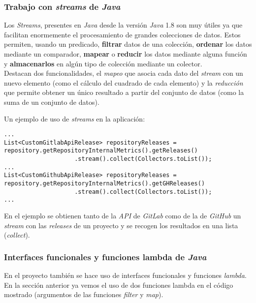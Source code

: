 \subsubsection{Trabajo con \textit{streams} de \textit{Java}}

Los \textit{Streams}, presentes en \textit{Java} desde la versión \textit{Java} 1.8 son muy útiles ya que facilitan enormemente el procesamiento de grandes colecciones de datos. Estos permiten, usando un predicado, \textbf{filtrar} datos de una colección, \textbf{ordenar} los datos mediante un comparador, \textbf{mapear} o \textbf{reducir} los datos mediante alguna función y \textbf{almacenarlos} en algún tipo de colección mediante un colector. \\ 
Destacan dos funcionalidades, el \textit{mapeo} que asocia cada dato del \textit{stream} con un nuevo elemento (como el cálculo del cuadrado de cada elemento) y la \textit{reducción} que permite obtener un único resultado a partir del conjunto de datos (como la suma de un conjunto de datos).

Un ejemplo de uso de \textit{streams} en la aplicación:\\
\begin{minipage}{\linewidth}
{\tiny
\begin{verbatim}
...
List<CustomGitlabApiRelease> repositoryReleases = repository.getRepositoryInternalMetrics().getReleases()
					.stream().collect(Collectors.toList());
...
List<CustomGithubApiRelease> repositoryReleases = repository.getRepositoryInternalMetrics().getGHReleases()
					.stream().collect(Collectors.toList());
...
\end{verbatim}
}
\end{minipage}

En el ejemplo se obtienen tanto de la \textit{API} de \textit{GitLab} como de la de \textit{GitHub} un \textit{stream} con las \textit{releases} de un proyecto y se recogen los resultados en una lista (\textit{collect}).


\subsubsection{Interfaces funcionales y funciones lambda de \textit{Java}}

En el proyecto también se hace uso de interfaces funcionales y funciones \textit{lambda}. En la sección anterior ya vemos el uso de dos funciones lambda en el código mostrado (argumentos de las funciones \textit{filter} y \textit{map}).

